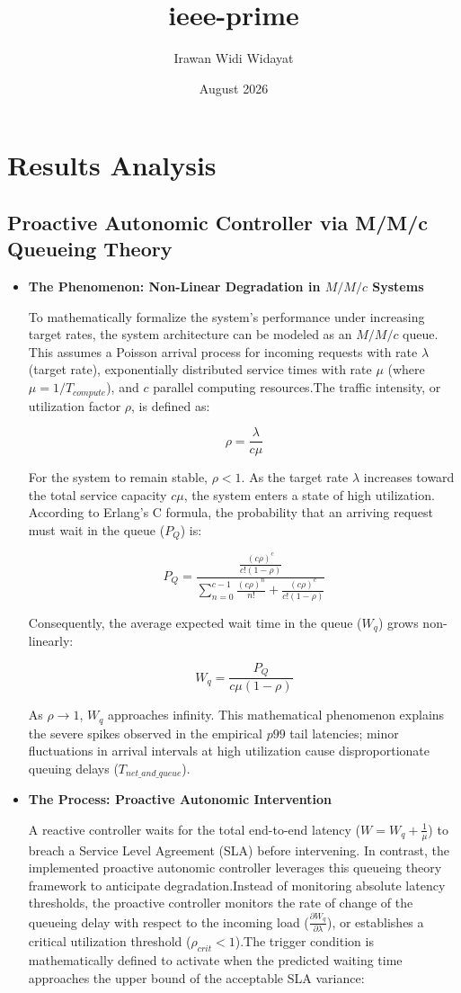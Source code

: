 \documentclass{article}
\title{ieee-prime}
\author{Irawan Widi Widayat}
\date{August 2026}
\begin{document}
\maketitle

\section{Results Analysis}
\subsection{Proactive Autonomic Controller via M/M/c Queueing Theory} 

\begin{itemize}
    \item \textbf{The Phenomenon: Non-Linear Degradation in $M/M/c$ Systems}  

To mathematically formalize the system's performance under increasing target rates, the system architecture can be modeled as an $M/M/c$ queue. This assumes a Poisson arrival process for incoming requests with rate $\lambda$ (target rate), exponentially distributed service times with rate $\mu$ (where $\mu = 1 / T_{compute}$), and $c$ parallel computing resources.The traffic intensity, or utilization factor $\rho$, is defined as:

$$\rho = \frac{\lambda}{c\mu}$$

For the system to remain stable, $\rho < 1$. As the target rate $\lambda$ increases toward the total service capacity $c\mu$, the system enters a state of high utilization. According to Erlang's C formula, the probability that an arriving request must wait in the queue ($P_Q$) is:

$$P_Q = \frac{\frac{(c\rho)^c}{c!(1-\rho)}}{\sum_{n=0}^{c-1} \frac{(c\rho)^n}{n!} + \frac{(c\rho)^c}{c!(1-\rho)}}$$

Consequently, the average expected wait time in the queue ($W_q$) grows non-linearly:

$$W_q = \frac{P_Q}{c\mu(1-\rho)}$$

As $\rho \to 1$, $W_q$ approaches infinity. This mathematical phenomenon explains the severe spikes observed in the empirical $p99$ tail latencies; minor fluctuations in arrival intervals at high utilization cause disproportionate queuing delays ($T_{net\_and\_queue}$).

\item \textbf{The Process: Proactive Autonomic Intervention}

A reactive controller waits for the total end-to-end latency ($W = W_q + \frac{1}{\mu}$) to breach a Service Level Agreement (SLA) before intervening. In contrast, the implemented proactive autonomic controller leverages this queueing theory framework to anticipate degradation.Instead of monitoring absolute latency thresholds, the proactive controller monitors the rate of change of the queueing delay with respect to the incoming load ($\frac{\partial W_q}{\partial \lambda}$), or establishes a critical utilization threshold ($\rho_{crit} < 1$).The trigger condition is mathematically defined to activate when the predicted waiting time approaches the upper bound of the acceptable SLA variance:


\end{itemize}
\end{document}
